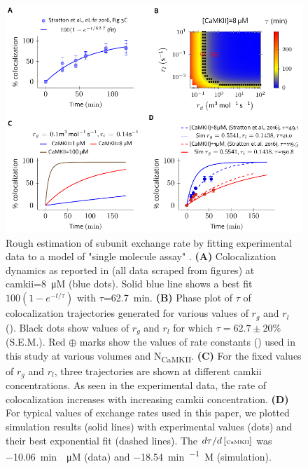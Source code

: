 \documentclass[9pt,lineno,doublespacing]{elife}
\newcommand\SUB[2]{#1\textsubscript{#2}}
\begin{document}
\begin{figure}[ht!]
    \includegraphics[width=0.95\linewidth]{./PaperFigures/elifeFigure8/figure_exchange_rate.pdf}
    \caption{Rough estimation of subunit exchange rate by fitting experimental
        data to a model of "single molecule assay" \cite{stratton_activation-triggered_2014}. 
        \textbf{(A)} Colocalization dynamics as reported in 
        \cite{stratton_activation-triggered_2014} (all data scraped from figures) at
        \gls{camkii}=\SI{8}{\micro M} (blue dots). Solid blue line shows a best
        fit $100(1-e^{-t/\tau})$ with $\tau$=\SI{62.7}{min}. 
        \textbf{(B)} Phase plot of $\tau$ of colocalization trajectories generated 
        for various values of $r_g$ and $r_l$ (). Black dots show values
        of $r_g$ and $r_l$ for which $\tau=62.7\pm 20\%$ (S.E.M.). Red
        $\oplus$ marks show the values of rate constants () 
        used in this study at various volumes and \SUB{N}{CaMKII}. 
        \textbf{(C)} For the fixed values of $r_g$ and $r_l$, three trajectories 
        are shown at different \gls{camkii} concentrations. As seen in the experimental data, 
        the rate of colocalization increases with increasing \gls{camkii} concentration. 
        \textbf{(D)} For typical values of exchange rates used in this paper, we plotted
        simulation results (solid lines) with experimental values (dots) and their best
        exponential fit (dashed lines). The ${d\tau}/{d\left[\text{\tiny CaMKII}\right]}$ 
        was \SI{-10.06}{min \per \micro M} (data) and \SI{-18.54}{min\per\micro
        M} (simulation).
    }\label{fig:estimate_of_exchange_rate}
\end{figure}
\end{document}
